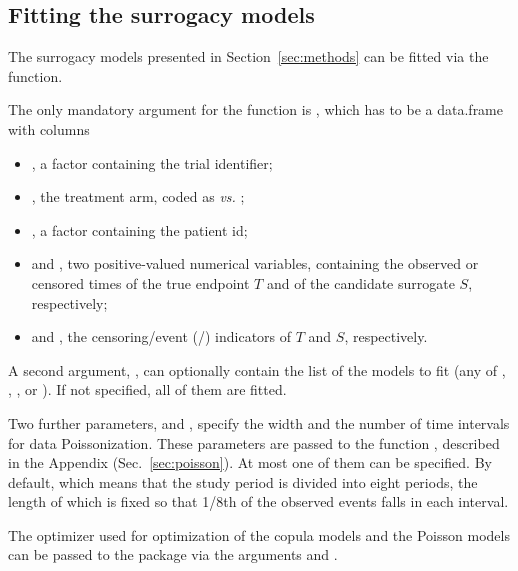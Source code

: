 \documentclass[]{scrartcl}\usepackage[]{graphicx}\usepackage[]{color}
\begin{document}
{{\subsection{Fitting the surrogacy models}
  The surrogacy models presented in Section~\ref{sec:methods}
  can be fitted via the  function.
  
  The only mandatory argument for the  function is
  , which has to be a data.frame with columns
  \begin{itemize}
  \item {}, a factor containing the trial identifier;
  \item {}, the treatment arm, coded as  \textit{vs.} ;
  \item {}, a factor containing the patient id;
  \item {} and , two positive-valued numerical variables,
  containing the observed or censored times of the true endpoint $T$
  and of the candidate surrogate $S$, respectively;
  \item {} and ,
  the censoring/event (/) indicators of $T$ and $S$, respectively.
  \end{itemize}
  
  A second argument, , can optionally contain the list of the models to fit
  (any of , , , or ).
  If not specified, all of them are fitted.
  
  Two further parameters,  and ,
  specify the width and the number of time intervals for data Poissonization.
These parameters are passed to the function ,
  described in the Appendix (Sec.~\ref{sec:poisson}).
  At most one of them can be specified.
  By default,  which means that the study period is divided into
  eight periods, the length of which is fixed so that 1/8th of the observed
  events falls in each interval.
  
  The optimizer used for optimization of the copula models and the Poisson models
  can be passed to the  package \citep{optimxJSS, R:optimx}
  via the arguments  and .
  
}}
\end{document}
